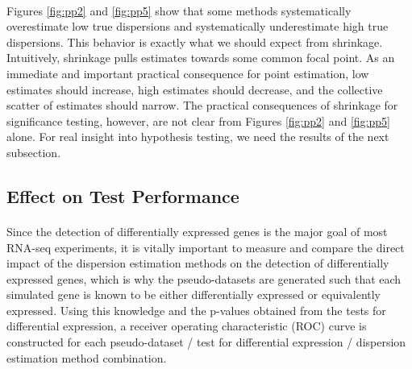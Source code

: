 \documentclass[10pt]{article}
\begin{document}
{\color{blue}
\paragraph{} \indent Figures \ref{fig:pp2} and \ref{fig:pp5} show that some methods systematically overestimate low true dispersions and systematically underestimate high true dispersions. This behavior is exactly what we should expect from shrinkage. Intuitively, shrinkage pulls estimates towards some common focal point. As an immediate and important practical consequence for point estimation, low estimates should increase, high estimates should decrease, and the collective scatter of estimates should narrow. The practical consequences of shrinkage for significance testing, however, are not clear from Figures \ref{fig:pp2} and \ref{fig:pp5} alone. For real insight into hypothesis testing, we need the results of the next subsection.}


\subsection*{Effect on Test Performance} \label{subsec:test}

\paragraph{} \indent Since the detection of differentially expressed genes is the major goal of most RNA-seq experiments, it is vitally important to measure and compare the direct impact of the dispersion estimation methods on the detection of differentially expressed genes, %
 which is why the pseudo-datasets are generated such that each simulated gene is known to be either differentially expressed 
 or equivalently expressed. %
  Using this knowledge and the p-values obtained from the tests for differential expression, a receiver operating characteristic (ROC) curve is constructed for each pseudo-dataset / test for differential expression %
  / dispersion estimation method combination. %
  
\end{document}

